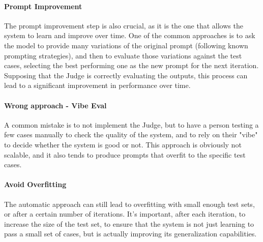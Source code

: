 \paragraph{Prompt Improvement}
The prompt improvement step is also crucial, as it is the one that allows the system to learn and improve over time.
One of the common approaches is to ask the model to provide many variations of the original prompt (following known prompting strategies),
and then to evaluate those variations against the test cases, selecting the best performing one as the new prompt for the next iteration.
\\
Supposing that the Judge is correctly evaluating the outputs, this process can lead to a significant improvement in performance over time.

\paragraph{Wrong approach - Vibe Eval}
A common mistake is to not implement the Judge, but to have a person testing a few cases manually to check the
quality of the system, and to rely on their "vibe" to decide whether the system is good or not.
This approach is obviously not scalable, and it also tends to produce prompts that overfit to the specific test cases.

\paragraph{Avoid Overfitting}
The automatic approach can still lead to overfitting with small enough test sets, or after a certain number of iterations.
It's important, after each iteration, to increase the size of the test set, to ensure that the system is not just learning to 
pass a small set of cases, but is actually improving its generalization capabilities.

